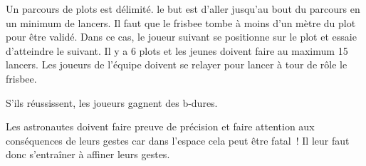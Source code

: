 \documentclass{grand-jeu}
\begin{document}
\begin{liste-materiel}
\end{liste-materiel}

\begin{regles}
Un parcours de plots est délimité. le but est d'aller jusqu'au bout du parcours en un minimum de lancers. 
Il faut que le frisbee tombe à moins d'un mètre du plot pour être validé. Dans ce cas, le joueur suivant se positionne sur le plot et essaie d'atteindre le suivant.
Il y a 6 plots et les jeunes doivent faire au maximum 15 lancers. 
Les joueurs de l'équipe doivent se relayer pour lancer à tour de rôle le frisbee. 

S’ils réussissent, les joueurs gagnent des b-dures. 
\end{regles}

\begin{imaginaire}
Les astronautes doivent faire preuve de précision et faire attention aux conséquences de leurs gestes car dans l'espace cela peut être fatal ! Il leur faut donc s'entraîner à affiner leurs gestes. 
\end{imaginaire}

\begin{moments-stop}
\end{moments-stop}
\end{document}
